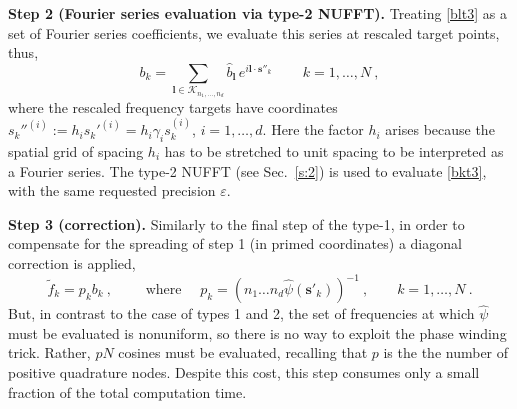 \documentclass[10pt]{article}
\newcommand{\be}{\begin{equation}}
\newcommand{\ee}{\end{equation}}
\newcommand{\mbf}[1]{{\mathbf #1}}
\newcommand{\eps}{\varepsilon}
\newcommand{\sss}{\mbf{s}}
\newcommand{\KK}{{\mathcal K}}
\newcommand{\NU}{{nonuniform}}
\begin{document}
{\bf Step 2 (Fourier series evaluation via type-2 NUFFT).}
Treating \eqref{blt3} as a set of Fourier series coefficients, we
evaluate this series at rescaled target points, thus,
\be
b_k = \sum_{\mbf{l} \in \KK_{n_1,\dots,n_d}}
\!\! \hat b_\mbf{l} \, e^{i\mbf{l}\cdot \sss''_k}
\,\qquad k=1,\dots,N
~,
\label{bkt3}
\ee
where the rescaled frequency targets have coordinates
${s_k''}^{(i)} := h_i {s_k'}^{(i)} = h_i\gamma_i s_k^{(i)}$, $i=1,\dots,d$.
Here the factor $h_i$ arises because the spatial grid of spacing $h_i$
has to be stretched to unit spacing to be interpreted as a Fourier series.
The type-2 NUFFT (see Sec.~\ref{s:2}) is used to evaluate \eqref{bkt3},
with the same requested precision $\eps$.

{\bf Step 3 (correction).}
Similarly to the final step of the type-1,
in order to compensate for the spreading of step 1 (in primed coordinates)
a diagonal correction is applied,
$$
\tilde f_k = p_k b_k
~,\qquad 
\mbox{ where }
\quad p_k = (n_1\dots n_d \hat\psi(\sss'_k))^{-1}~, \qquad k=1,\dots,N
~.
$$
But, in contrast to the case of types 1 and 2,
the set of frequencies at which $\hat\psi$ must be evaluated is %
\NU, so there is no way to exploit the phase winding trick.
Rather, $pN$ cosines must be evaluated,
recalling that $p$ is the the number of positive quadrature nodes.
Despite this cost, this step consumes only a small fraction of the
total computation time.
\end{document}
